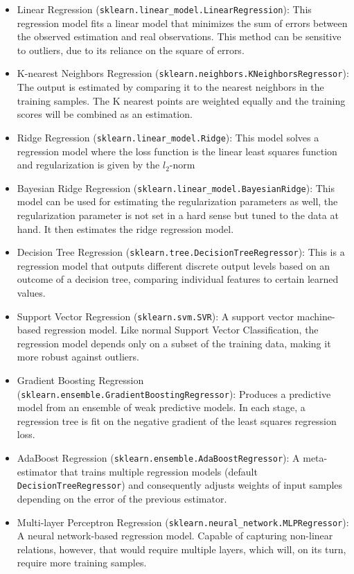\begin{itemize}
	\item Linear Regression (\verb|sklearn.linear_model.LinearRegression|): This regression model fits a linear model that minimizes the sum of errors between the observed estimation and real observations. This method can be sensitive to outliers, due to its reliance on the square of errors.
	\item K-nearest Neighbors Regression (\verb|sklearn.neighbors.KNeighborsRegressor|): The output is estimated by comparing it to the nearest neighbors in the training samples. The K nearest points are weighted equally and the training scores will be combined as an estimation.
	\item Ridge Regression (\verb|sklearn.linear_model.Ridge|): This model solves a regression model where the loss function is the linear least squares function and regularization is given by the $l_2$-norm
	\item Bayesian Ridge Regression (\verb|sklearn.linear_model.BayesianRidge|): This model can be used for estimating the regularization parameters as well, the regularization parameter is not set in a hard sense but tuned to the data at hand. It then estimates the ridge regression model.
	\item Decision Tree Regression (\verb|sklearn.tree.DecisionTreeRegressor|): This is a regression model that outputs different discrete output levels based on an outcome of a decision tree, comparing individual features to certain learned values.
	\item Support Vector Regression (\verb|sklearn.svm.SVR|): A support vector machine-based regression model. Like normal Support Vector Classification, the regression model depends only on a subset of the training data, making it more robust against outliers.
	\item Gradient Boosting Regression (\verb|sklearn.ensemble.GradientBoostingRegressor|): Produces a predictive model from an ensemble of weak predictive models. In each stage, a regression tree is fit on the negative gradient of the least squares regression loss.
	\item AdaBoost Regression (\verb|sklearn.ensemble.AdaBoostRegressor|): A meta-estimator that trains multiple regression models (default \verb|DecisionTreeRegressor|) and consequently adjusts weights of input samples depending on the error of the previous estimator.
	\item Multi-layer Perceptron Regression (\verb|sklearn.neural_network.MLPRegressor|): A neural network-based regression model. Capable of capturing non-linear relations, however, that would require multiple layers, which will, on its turn, require more training samples. 
\end{itemize}

